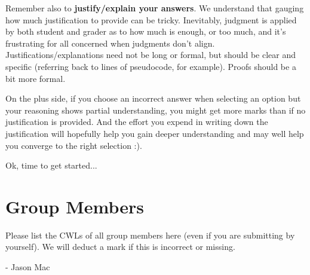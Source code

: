 \documentclass[11pt,fleqn]{exam}
\newif\ifsolutions\solutionsfalse
\begin{document}
Remember also  to \textbf{justify/explain  your answers}. We  understand that  gauging how
much  justification to  provide can  be tricky.  Inevitably, judgment  is applied  by both
student and  grader as to how  much is enough, or  too much, and it's  frustrating for all
concerned  when judgments  don't align.  Justifications/explanations need  not be  long or
formal, but  should be  clear and  specific (referring  back to  lines of  pseudocode, for
example). Proofs should be a bit more formal.

On the  plus side, if  you choose an  incorrect answer when  selecting an option  but your
reasoning shows partial  understanding, you might get more marks  than if no justification
is provided. And  the effort you expend  in writing down the  justification will hopefully
help you gain deeper  understanding and may well help you converge  to the right selection
:).

\vspace{.1in}

Ok, time to get started...

\clearpage

\section*{Group Members}

Please list the CWLs of all group members here (even if you are submitting by yourself). We will deduct a mark if this is incorrect or missing.

- Jason Mac


\ifsolutions\else\newpage\fi
\end{document}
